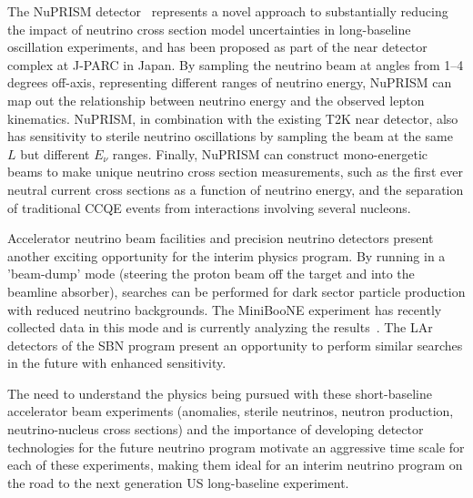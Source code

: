 The NuPRISM detector~\cite{Bhadra:2014oma} represents a novel approach
to substantially reducing the impact of neutrino cross section model
uncertainties in long-baseline oscillation experiments, and has been
proposed as part of the near detector complex at J-PARC in Japan. By
sampling the neutrino beam at angles from 1--4 degrees off-axis,
representing different ranges of neutrino energy, NuPRISM can map out
the relationship between neutrino energy and the observed lepton
kinematics. NuPRISM, in combination with the existing T2K near
detector, also has sensitivity to sterile neutrino oscillations by
sampling the beam at the same $L$ but different $E_{\nu}$
ranges. Finally, NuPRISM can construct mono-energetic beams to make
unique neutrino cross section measurements, such as the first ever
neutral current cross sections as a function of neutrino energy, and
the separation of traditional CCQE events from interactions involving
several nucleons.

Accelerator neutrino beam facilities and precision neutrino detectors
present another exciting opportunity for the interim physics program.
By running in a 'beam-dump' mode (steering the proton beam off the
target and into the beamline absorber), searches can be performed for
dark sector particle production with reduced neutrino backgrounds.
The MiniBooNE experiment has recently collected data in this mode and
is currently analyzing the
results~\cite{Dharmapalan:2012xp,Thornton:2014ufa}.  The LAr detectors
of the SBN program present an opportunity to perform similar searches
in the future with enhanced sensitivity.

The need to understand the physics being pursued with these
short-baseline accelerator beam experiments (anomalies, sterile
neutrinos, neutron production, neutrino-nucleus cross sections) and
the importance of developing detector technologies for the future
neutrino program motivate an aggressive time scale for each of these
experiments, making them ideal for an interim neutrino program on the
road to the next generation US long-baseline experiment.
